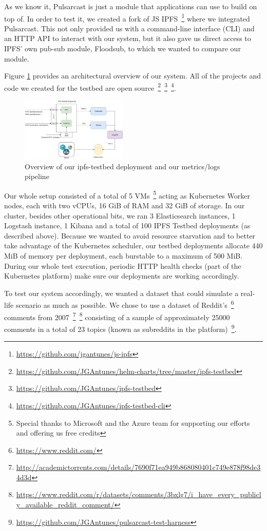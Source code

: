 As we know it, Pulsarcast is just a module that applications can use to build
on top of. In order to test it, we created a fork of JS
IPFS~\footnote{\url{https://github.com/jgantunes/js-ipfs}} where we integrated
Pulsarcast. This not only provided us with a command-line interface (CLI) and
an HTTP API to interact with our system, but it also gave us direct access to
IPFS' own pub-sub module, Floodsub, to which we wanted to compare our module.

Figure \ref{fig:ipfs-testbed-and-metrics} provides an architectural overview of
our system. All of the projects and code we created for the testbed are
open
source~\footnote{\url{https://github.com/JGAntunes/helm-charts/tree/master/ipfs-testbed}}~\footnote{\url{https://github.com/JGAntunes/ipfs-testbed}}~\footnote{\url{https://github.com/JGAntunes/ipfs-testbed-cli}}.

\begin{figure}[!htb]
  \centering
  \includegraphics[width=0.45\textwidth]{../images/ipfs-testbed-and-metrics.png}
  \caption{Overview of our ipfs-testbed deployment and our metrics/logs
  pipeline}
  \label{fig:ipfs-testbed-and-metrics}
\end{figure}

Our whole setup consisted of a total of 5 VMs~\footnote{Special thanks to
Microsoft and the Azure team for supporting our efforts and offering us free
credits} acting as Kubernetes Worker nodes, each with two vCPUs, 16 GiB of RAM
and 32 GiB of storage. In our cluster, besides other operational bits, we ran 3
Elasticsearch instances, 1 Logstash instance, 1 Kibana and a total of 100 IPFS
Testbed deployments (as described above). Because we wanted to avoid resource
starvation and to better take advantage of the Kubernetes scheduler, our
testbed deployments allocate 440 MiB of memory per deployment, each burstable
to a maximum of 500 MiB. During our whole test execution, periodic HTTP health
checks (part of the Kubernetes platform) make sure our deployments are working
accordingly.

To test our system accordingly, we wanted a dataset that could simulate a
real-life scenario as much as possible. We chose to use a dataset of
Reddit's~\footnote{\url{https://www.reddit.com/}} comments from
2007~\footnote{\url{http://academictorrents.com/details/7690f71ea949b868080401c749e878f98de34d3d}}~\footnote{\url{https://www.reddit.com/r/datasets/comments/3bxlg7/i_have_every_publicly_available_reddit_comment/}}
consisting of a sample of approximately 25000 comments in a total of 23 topics
(known as subreddits in the platform)~\footnote{\url{https://github.com/JGAntunes/pulsarcast-test-harness}}.

